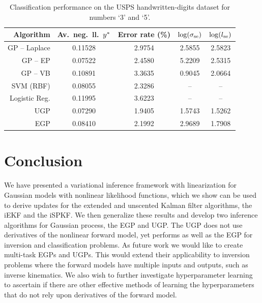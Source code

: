 \documentclass{article} %
\begin{document}
\begin{table}[tb]
    \centering
    \caption[]{Classification performance on the USPS handwritten-digits
        dataset for numbers `3' and `5'.}
    \footnotesize
    \begin{tabular}{r| c c c c}
        Algorithm & Av.\ neg.\ ll.\ $y^{*}$ & Error rate (\%) 
            & $\log\!\left({\sigma_\text{se}}\right)$ & $\log\!\left({l_\text{se}}\right)$ \\
        \toprule
        GP -- Laplace & 0.11528 & 2.9754 & 2.5855 & 2.5823 \\
        GP -- EP & 0.07522 & 2.4580 & 5.2209 & 2.5315 \\
        GP -- VB & 0.10891 & 3.3635 & 0.9045 & 2.0664 \\ 
        SVM (RBF) & 0.08055 & 2.3286 & -- & -- \\
        Logistic Reg. & 0.11995 & 3.6223 & -- & -- \\
        \midrule
        UGP & 0.07290 & 1.9405 & 1.5743 & 1.5262 \\
        EGP & 0.08410 & 2.1992 & 2.9689 & 1.7908 \\
        \bottomrule
    \end{tabular}
    \label{tab:class}
\end{table}


\section{Conclusion}

We have presented a variational inference framework with linearization for
Gaussian models with nonlinear likelihood functions, which we show can be used
to derive updates for the extended and unscented Kalman filter algorithms, the
iEKF and the iSPKF. We then generalize these results and develop two inference
algorithms for Gaussian process, the EGP and UGP. The UGP does not use
derivatives of the nonlinear forward model, yet performs as well as the EGP for
inversion and classification problems. As future work we would like to create
multi-task EGPs and UGPs. This would extend their applicability to inversion
problems where the forward models have multiple inputs and outputs, such as
inverse kinematics. We also wish to further investigate hyperparameter learning
to ascertain if there are other effective methods of learning the
hyperparameters that do not rely upon derivatives of the forward model. 


 





\end{document}
